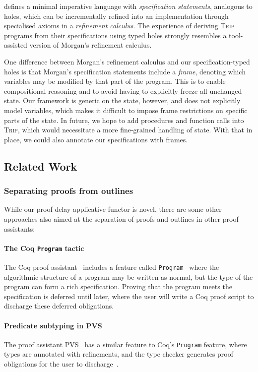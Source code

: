 \documentclass[sigplan,review]{acmart}\settopmatter{printfolios=true,printccs=false,printacmref=false}
\begin{document}
\citet{Morgan} defines a minimal imperative language with \emph{specification
statements}, analogous to holes, which can be incrementally refined into
an implementation through specialised axioms in a \emph{refinement calculus}. 
The experience of deriving \textsc{Trip} programs from their specifications 
using typed holes strongly resembles a tool-assisted version of Morgan's 
refinement calculus.

One difference between Morgan's refinement calculus and our specification-typed holes
is that Morgan's specification statements include a \emph{frame}, denoting 
which variables may be modified by that part of the program. This is to enable 
compositional reasoning and to avoid having to explicitly freeze all unchanged state.
Our framework is generic on the state, however, and does not explicitly model 
variables, which makes it difficult to impose frame restrictions on 
specific parts of the state. In future, we hope to add procedures 
and function calls into \textsc{Trip}, which would necessitate 
a more fine-grained handling of state. With that in place, we could 
also annotate our specifications with frames.

\subsection{Related Work}
\subsubsection{Separating proofs from outlines}
While our proof delay applicative functor is novel, there are some other approaches 
also aimed at the separation of proofs and outlines in other proof assistants:

\paragraph{The Coq \texttt{Program} tactic} The Coq proof assistant~\citep{coq}
includes a feature called \texttt{Program}~\citep{coqprogram} where the algorithmic structure 
of a program may be written as normal, but the type of the program can form 
a rich specification. Proving that the program meets the specification is 
deferred until later, where the user will write a Coq proof script to discharge 
these deferred obligations. 

\paragraph{Predicate subtyping in PVS} The proof assistant PVS~\citep{pvs} has 
a similar feature to Coq's \texttt{Program} feature, where types are annotated 
with refinements, and the type checker generates proof obligations for the user 
to discharge~\citep{pvsprogram}.\medskip
\end{document}
